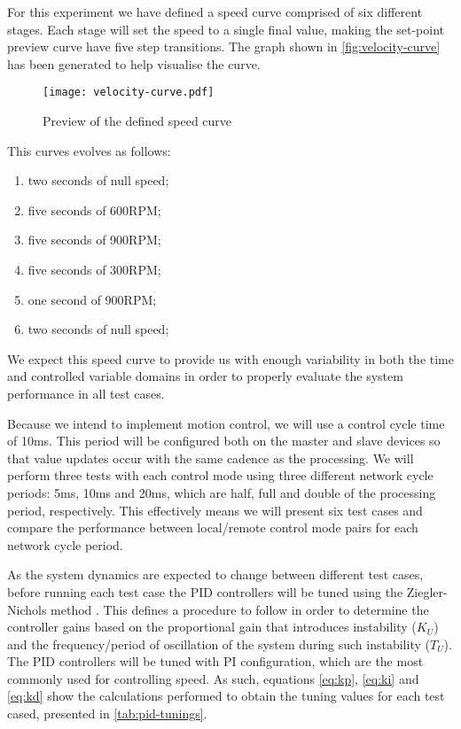 For this experiment we have defined a speed curve comprised of six different stages.
Each stage will set the speed to a single final value, making the set-point preview curve have five step transitions.
The graph shown in \autoref{fig:velocity-curve} has been generated to help visualise the curve.

\begin{figure}[htp]
	\centering
	\texttt{[image: velocity-curve.pdf]}
	\caption{Preview of the defined speed curve}
	\label{fig:velocity-curve}
\end{figure}

This curves evolves as follows:
\begin{enumerate}
	\item two seconds of null speed;
	\item five seconds of 600RPM;
	\item five seconds of 900RPM;
	\item five seconds of 300RPM;
	\item one second of 900RPM;
	\item two seconds of null speed;
\end{enumerate}
We expect this speed curve to provide us with enough variability in both the time and controlled variable domains in order to properly evaluate the system performance in all test cases.

Because we intend to implement motion control, we will use a control cycle time of 10ms.
This period will be configured both on the master and slave devices so that value updates occur with the same cadence as the processing.
We will perform three tests with each control mode using three different network cycle periods: 5ms, 10ms and 20ms, which are half, full and double of the processing period, respectively.
This effectively means we will present six test cases and compare the performance between local/remote control mode pairs for each network cycle period.

As the system dynamics are expected to change between different test cases, before running each test case the PID controllers will be tuned using the Ziegler-Nichols method \cite{pid:zn-method}.
This defines a procedure to follow in order to determine the controller gains based on the proportional gain that introduces instability ($K_U$) and the frequency/period of oscillation of the system during such instability ($T_U$).
The PID controllers will be tuned with PI configuration, which are the most commonly used for controlling speed.
As such, equations \ref{eq:kp}, \ref{eq:ki} and \ref{eq:kd} show the calculations performed to obtain the tuning values for each test cased, presented in \autoref{tab:pid-tunings}.

